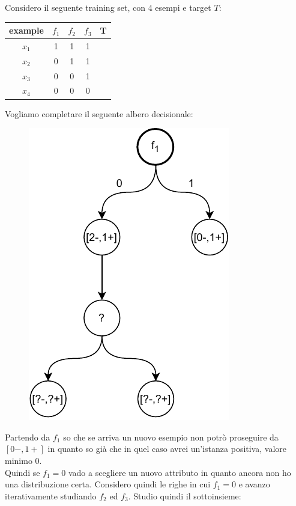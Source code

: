 \documentclass[a4paper,12pt, oneside]{book}
\begin{document}
\begin{esercizio}
  Considero il seguente training set, con 4 esempi e target $T$:
  \begin{table}[H]
    \centering
    \begin{tabular}{c|c|c|c|c}
      example & $f_1$ & $f_2$ & $f_3$ & T\\
      \hline
      $x_1$ & 1 & 1 & 1 & \color{darkgreen}{1}\\
      $x_2$ & 0 & 1 & 1 & \color{red}{0}\\
      $x_3$ & 0 & 0 & 1 & \color{darkgreen}{1}\\
      $x_4$ & 0 & 0 & 0 & \color{red}{0}\\
    \end{tabular}
  \end{table}
  Vogliamo completare il seguente albero decisionale:
  \begin{figure}[H]
    \centering
    \includegraphics[scale = 0.75]{img/id5.pdf}
  \end{figure}
  Partendo da $f_1$ so che se arriva un nuovo esempio non potrò proseguire da
  $[0-,1+]$ in quanto so già che in quel caso avrei un'istanza positiva, valore
  minimo $0$.\\
  Quindi se $f_1=0$ vado a scegliere un nuovo attributo in quanto ancora non ho
  una distribuzione certa. Considero quindi le righe in cui $f_1=0$ e avanzo
  iterativamente studiando $f_2$ ed $f_3$. Studio quindi il sottoinsieme: 

\end{esercizio}
\end{document}
